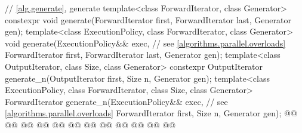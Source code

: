 \begin{codeblock}
{  // \ref{alg.generate}, generate
  template<class ForwardIterator, class Generator>
    constexpr void generate(ForwardIterator first, ForwardIterator last,
                            Generator gen);
  template<class ExecutionPolicy, class ForwardIterator, class Generator>
    void generate(ExecutionPolicy&& exec, // see \ref{algorithms.parallel.overloads}
                  ForwardIterator first, ForwardIterator last,
                  Generator gen);
  template<class OutputIterator, class Size, class Generator>
    constexpr OutputIterator generate_n(OutputIterator first, Size n, Generator gen);
  template<class ExecutionPolicy, class ForwardIterator, class Size, class Generator>
    ForwardIterator generate_n(ExecutionPolicy&& exec, // see \ref{algorithms.parallel.overloads}
                               ForwardIterator first, Size n, Generator gen);
  @@
    @@
        @@
      @@
    @@
        @@
      @@
        @@
    @@
        @@
      @@
  @\added{\}}@

}
\end{codeblock}
